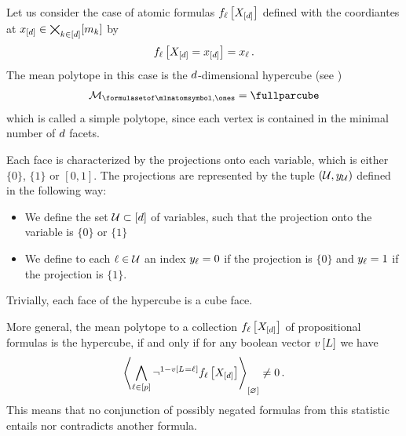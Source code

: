\begin{example}
    \label{exa:atomicFormulasHypercube}
    Let us consider the case of atomic formulas $f_{\ell}\left[X_{[d]}\right]$ defined with the coordiantes at $x_{[d]}\in\bigtimes_{k\in[d]}[m_{k}]$ by
    \begin{align*}
        f_{\ell}\left[X_{[d]}=x_{[d]}\right]
        = x_{\ell} \, .
    \end{align*}
    The mean polytope in this case is the $d$-dimensional hypercube (see )
    \begin{align*}
        \meansetof{\atomformulaset,\ones}
        = \fullparcube
    \end{align*}
    which is called a simple polytope, since each vertex is contained in the minimal number of $d$ facets.

    Each face is characterized by the projections onto each variable, which is either $\{0\}$, $\{1\}$ or $[0,1]$.
    The projections are represented by the tuple $(\mathcal{U},y_{\mathcal{U}})$ defined in the following way:
    \begin{itemize}
        \item We define the set $\mathcal{U}\subset[d]$ of variables, such that the projection onto the variable is $\{0\}$ or $\{1\}$
        \item We define to each $\ell\in\mathcal{U}$ an index $y_{\ell}=0$ if the projection is $\{0\}$ and $y_{\ell}=1$ if the projection is $\{1\}$.
    \end{itemize}
    Trivially, each face of the hypercube is a cube face. %

    More general, the mean polytope to a collection $f_{\ell}\left[X_{[d]}\right]$ of propositional formulas is the hypercube, if and only if for any boolean vector $v\left[L\right]$ we have
    \begin{align*}
        \left\langle \bigwedge_{\ell\in[p]}\lnot^{1-v\left[L_{}=\ell_{}\right]}f_{\ell}\left[X_{[d]}\right]\right\rangle_{\left[ \varnothing \right]}
        \neq 0 \, .
    \end{align*}
    This means that no conjunction of possibly negated formulas from this statistic entails nor contradicts another formula.

\end{example}